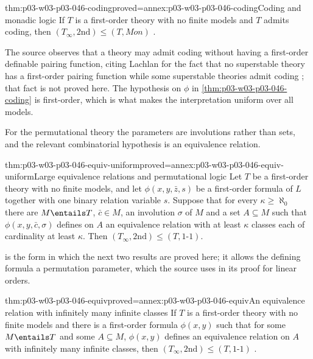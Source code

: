 \begin{hblemma}{thm:p03-w03-p03-046-coding}{proved=annex:p03-w03-p03-046-coding}{Coding and monadic logic}
If \(T\) is a first-order theory with no finite models and \(T\) admits
coding, then \((T_\infty,\mathrm{2nd})\le(T,\mathit{Mon})\)
\cite[p.~243, Lemma~2.2.4]{BaldwinShelah1985}.
\end{hblemma}

The source observes that a theory may admit coding without having a
first-order definable pairing function, citing Lachlan for the fact that
no superstable theory has a first-order pairing function while some
superstable theories admit coding \cite[p.~243]{BaldwinShelah1985}; that
fact is not proved here. The hypothesis on \(\phi\) in
\cref{thm:p03-w03-p03-046-coding} is first-order, which is what makes the
interpretation uniform over all models.

For the permutational theory the parameters are involutions rather than
sets, and the relevant combinatorial hypothesis is an equivalence relation.

\begin{hblemma}{thm:p03-w03-p03-046-equiv-uniform}{proved=annex:p03-w03-p03-046-equiv-uniform}{Large equivalence relations and permutational logic}
Let \(T\) be a first-order theory with no finite models, and let
\(\phi(x,y,\bar z,s)\) be a first-order formula of \(L\) together with one
binary relation variable \(s\). Suppose that for every
\(\kappa\ge\aleph_0\) there are \(M\entails T\), \(\bar c\in M\), an
involution \(\sigma\) of \(M\) and a set \(A\subseteq M\) such that
\(\phi(x,y,\bar c,\sigma)\) defines on \(A\) an equivalence relation with at
least \(\kappa\) classes each of cardinality at least \(\kappa\). Then
\((T_\infty,\mathrm{2nd})\le(T,\text{1-1})\).
\end{hblemma}

 is the form in which the next two
results are proved here; it allows the defining formula a permutation
parameter, which the source uses in its proof for linear orders.

\begin{hblemma}{thm:p03-w03-p03-046-equiv}{proved=annex:p03-w03-p03-046-equiv}{An equivalence relation with infinitely many infinite classes}
If \(T\) is a first-order theory with no finite models and there is a
first-order formula \(\phi(x,y)\) such that for some \(M\entails T\) and some
\(A\subseteq M\), \(\phi(x,y)\) defines an equivalence relation on \(A\)
with infinitely many infinite classes, then
\((T_\infty,\mathrm{2nd})\le(T,\text{1-1})\)
\cite[p.~244, Lemma~2.2.6]{BaldwinShelah1985}.
\end{hblemma}

